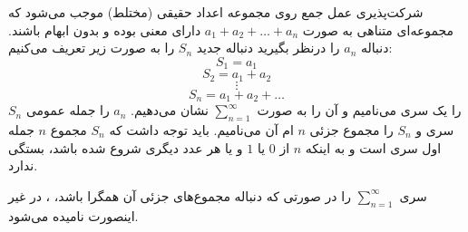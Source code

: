 \begin{definition}
    \p
    شرکت‌پذیری عمل جمع روی مجموعه اعداد حقیقی (مختلط) موجب می‌شود که مجموعه‌ای متناهی به صورت
    $a_1 + a_2 + \ldots + a_n$
    دارای معنی بوده و بدون ابهام باشند.
    \p
   دنباله
$a_n$
   را درنظر بگیرید دنباله جدید
$S_n$
   را به صورت زیر تعریف می‌کنیم:
   $$S_1 = a_1$$
   $$ S_2 = a_1 + a_2$$
   $$\vdots$$ 
   $$S_n = a_1 + a_2 + \ldots $$
   \p
   $S_n$
   را یک سری می‌نامیم و آن را به صورت
   $\sum_{n=1}^{\infty}$
   نشان می‌دهیم.
   $a_n$
   را جمله عمومی سری و
   $S_n$
   را مجموع جزئی
   $n$
   ام آن می‌نامیم.
   \p
   باید توجه داشت که
   $S_n$
   مجموع
   $n$
   جمله اول سری است و به اینکه 
   $n$
   از 
   $0$
   یا
   $1$
و یا هر عدد دیگری شروع شده باشد، بستگی ندارد.
\end{definition}
	
	
\begin{definition}
    \p
    سری
   $\sum_{n=1}^{\infty}$
را در صورتی که دنباله مجموع‌های جزئی آن همگرا باشد، 
، در غیر اینصورت 
 نامیده می‌شود.
\end{definition}
	